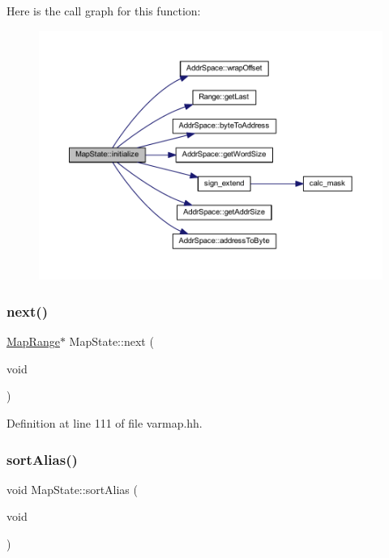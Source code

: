 Here is the call graph for this function\+:
\nopagebreak
\begin{figure}[H]
\begin{center}
\leavevmode
\includegraphics[width=350pt]{class_map_state_a517ee785ba7b8b397e76b75d8e085bae_cgraph}
\end{center}
\end{figure}
\mbox{\label{class_map_state_aaf25115c1c0c0f92190524ca722a2aa6}} 
\subsubsection{\texorpdfstring{next()}{next()}}
{\footnotesize\ttfamily \mbox{\hyperlink{struct_map_range}{Map\+Range}}$\ast$ Map\+State\+::next (\begin{DoxyParamCaption}\item[{void}]{ }\end{DoxyParamCaption})\hspace{0.3cm}{\ttfamily [inline]}}



Definition at line 111 of file varmap.\+hh.

\mbox{\label{class_map_state_a609b3e862e2b69d179e2f500c59a0a53}} 
\subsubsection{\texorpdfstring{sortAlias()}{sortAlias()}}
{\footnotesize\ttfamily void Map\+State\+::sort\+Alias (\begin{DoxyParamCaption}\item[{void}]{ }\end{DoxyParamCaption})\hspace{0.3cm}{\ttfamily [inline]}}



